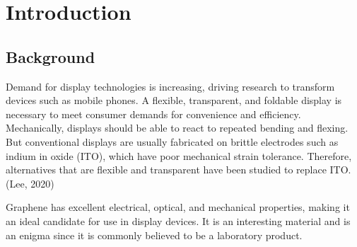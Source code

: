 \documentclass[a4paper,12pt]{article}
\numberwithin{equation}{section}
\numberwithin{figure}{section}
\begin{document}
\newpage
\tableofcontents

\newpage



\makeatletter
     \renewcommand*\l@figure{\@dottedtocline{1}{1em}{3.2em}}
\makeatother
\listoffigures
{}
{}
\newpage
\listoftables
{}
{}
\newpage
\printnomenclature
{}
{}


\newpage
\section{Introduction}

\subsection{Background}

\noindent Demand for display technologies is increasing, driving research to transform devices such as mobile phones. A flexible, transparent, and foldable display is necessary to meet consumer demands for convenience and efficiency. Mechanically, displays should be able to react to repeated bending and flexing. But conventional displays are usually fabricated on brittle electrodes such as indium in oxide (ITO), which have poor mechanical strain tolerance. Therefore, alternatives that are flexible and transparent have been studied to replace ITO. (Lee, 2020)\vspace{\baselineskip}

\noindent Graphene has excellent electrical, optical, and mechanical properties, making it an ideal candidate for use in display devices. It is an interesting material and is an enigma since it is commonly believed to be a laboratory product.\vspace{\baselineskip}
\end{document}
